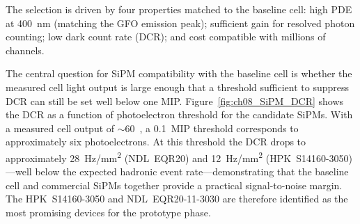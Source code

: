 \begin{table}[htbp]
\centering
\caption{Parameters of commercial SiPMs evaluated for the GS-HCAL\@.}
\label{tab:SiPM-tab1}
\end{table}

The selection is driven by four properties matched to the baseline
cell: high PDE at \SI{400}{nm} (matching the GFO emission peak);
sufficient gain for resolved photon counting; low dark count rate
(DCR); and cost compatible with millions of channels.

The central question for SiPM compatibility with the baseline cell is
whether the measured cell light output is large enough that a
threshold sufficient to suppress DCR can still be set well below one
MIP.
Figure~\ref{fig:ch08_SiPM_DCR} shows the DCR as a function of
photoelectron threshold for the candidate SiPMs.
With a measured cell output of ${\sim}60$~\peMIP, a \SI{0.1}{MIP}
threshold corresponds to approximately six photoelectrons.
At this threshold the DCR drops to approximately \SI{28}{Hz/mm^{2}}
(NDL~EQR20) and \SI{12}{Hz/mm^{2}} (HPK~S14160-3050)---well below the
expected hadronic event rate---demonstrating that the baseline cell
and commercial SiPMs together provide a practical
signal-to-noise margin.
The HPK~S14160-3050 and NDL~EQR20-11-3030 are therefore identified as
the most promising devices for the prototype phase.

